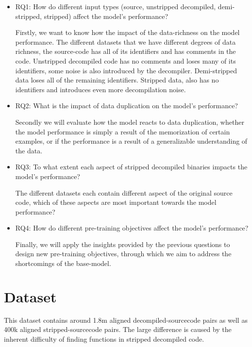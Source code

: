 \begin{itemize}
    \item RQ1: How do different input types (source, unstripped decompiled, demi-stripped, stripped) affect the model's performance?
    \begin{sloppypar}
    Firstly, we want to know how the impact of the data-richness on the model performance. The different datasets that we have different degrees of data richness, the source-code has all of its identifiers and has comments in the code. Unstripped decompiled code has no comments and loses many of its identifiers, some noise is also introduced by the decompiler. Demi-stripped data loses all of the remaining identifiers. Stripped data, also has no identifiers and introduces even more decompilation noise.
    \end{sloppypar}
    \item RQ2: What is the impact of data duplication on the model's performance?
    \begin{sloppypar}
    Secondly we will evaluate how the model reacts to data duplication, whether the model performance is simply a result of the memorization of certain examples, or if the performance is a result of a generalizable understanding of the data.
    \end{sloppypar}
    \item RQ3: To what extent each aspect of stripped decompiled binaries impacts the model's performance?
    \begin{sloppypar}
    The different datasets each contain different aspect of the original source code, which of these aspects are most important towards the model performance? 
    \end{sloppypar}
    \item RQ4: How do different pre-training objectives affect the model's performance?
    \begin{sloppypar}
    Finally, we will apply the insights provided by the previous questions to design new pre-training objectives, through which we aim to address the shortcomings of the base-model. 
    \end{sloppypar}
\end{itemize}

\section{Dataset}
This dataset contains around 1.8m aligned decompiled-sourcecode pairs as well as 400k aligned stripped-sourcecode pairs. The large difference is caused by the inherent difficulty of finding functions in stripped decompiled code. 

